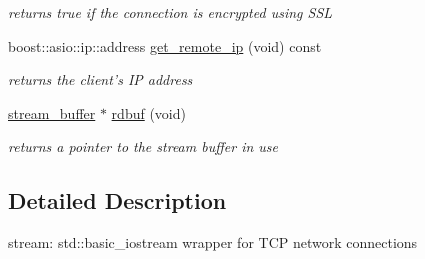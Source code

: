 \begin{DoxyCompactItemize}
\begin{DoxyCompactList}\small\item\em returns true if the connection is encrypted using S\-S\-L \end{DoxyCompactList}\item 
boost\-::asio\-::ip\-::address \hyperlink{classpion_1_1tcp_1_1stream_a56bb8792fd97a8cd522a6ba2802730db}{get\-\_\-remote\-\_\-ip} (void) const 
\begin{DoxyCompactList}\small\item\em returns the client's I\-P address \end{DoxyCompactList}\item 
\hyperlink{classpion_1_1tcp_1_1stream__buffer}{stream\-\_\-buffer} $\ast$ \hyperlink{classpion_1_1tcp_1_1stream_a73604ddf5106fd3df9922774a05f4930}{rdbuf} (void)
\begin{DoxyCompactList}\small\item\em returns a pointer to the stream buffer in use \end{DoxyCompactList}\end{DoxyCompactItemize}


\subsection{Detailed Description}
stream\-: std\-::basic\-\_\-iostream wrapper for T\-C\-P network connections 

